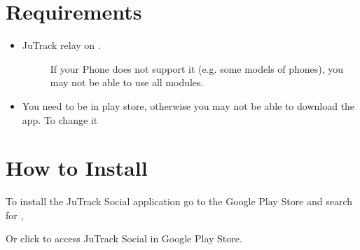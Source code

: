 \documentclass[letterpaper,10pt,english]{sphinxmanual}
\begin{document}
\section{Requirements}
\label{\detokenize{JuTrack_Social:requirements}}\begin{itemize}
\item {} \begin{description}
\item[{JuTrack relay on  .}] \leavevmode
If your Phone does not support it (e.g. some models of  phones), you may not be able to use all modules.

\end{description}

\item {} 
You need to be in  play store, otherwise you may not be able to download the app. To change it 

\end{itemize}

\begin{DUlineblock}{0em}
\item[] 
\end{DUlineblock}


\section{How  to Install}
\label{\detokenize{JuTrack_Social:how-to-install}}
To install the  JuTrack Social application  go to the Google Play Store and search for ,

\begin{DUlineblock}{0em}
\item[] Or click  to access JuTrack Social in Google Play Store.
\item[] 
\end{DUlineblock}


\begin{DUlineblock}{0em}
\item[] 
\end{DUlineblock}
\end{document}
